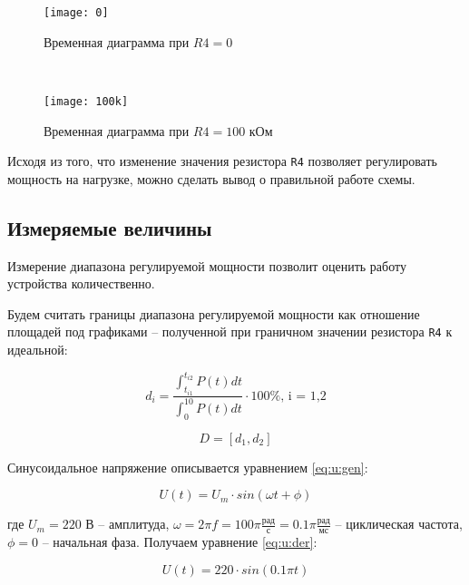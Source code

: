 \begin{figure}[H]
\begin{center}
	\texttt{[image: 0]}
	\caption{Временная диаграмма при $R4 = 0$}
	\label{pic:diag:0}
\end{center}
\end{figure}

~

\begin{figure}[H]
\begin{center}
	\texttt{[image: 100k]}
	\caption{Временная диаграмма при $R4 = 100$ кОм}
	\label{pic:diag:100k}
\end{center}
\end{figure}

Исходя из того, что изменение значения резистора \verb+R4+ позволяет регулировать мощность на нагрузке, можно сделать вывод о правильной работе схемы.

\subsection{Измеряемые величины}

Измерение диапазона регулируемой мощности позволит оценить работу устройства количественно.

Будем считать границы диапазона регулируемой мощности как отношение площадей под графиками -- полученной при граничном значении резистора \verb+R4+ к идеальной:

\begin{equation}
\label{eq:d:i}
	d_i = \frac{\int_{t_{i1}}^{t_{i2}} P(t) dt}{\int_{0}^{10} P(t) dt} \cdot 100\% \text{, i = 1,2}
\end{equation}

\begin{equation}
	D = [d_1, d_2]
\end{equation}

Синусоидальное напряжение описывается уравнением \ref{eq:u:gen}: 

\begin{equation}
\label{eq:u:gen}
	U(t) = U_m \cdot sin(\omega t + \phi)
\end{equation}

\noindent где $U_m = 220$ В -- амплитуда, $\omega = 2 \pi f = 100 \pi \frac{\text{рад}}{\text{с}} = 0.1\pi\frac{\text{рад}}{\text{мс}}$ -- циклическая частота, $\phi = 0$ -- начальная фаза. Получаем уравнение \ref{eq:u:der}:

\begin{equation}
\label{eq:u:der}
	U(t) = 220 \cdot sin \left(0.1 \pi t \right)
\end{equation}

